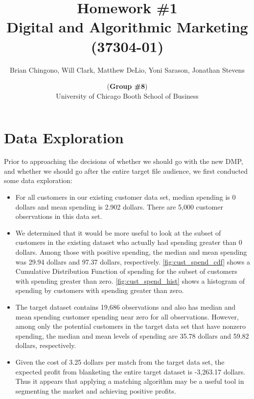 



\title{Homework \#1\\
Digital and Algorithmic Marketing (37304-01)}
\author{
Brian Chingono, Will Clark, Matthew DeLio, Yoni Sarason, Jonathan Stevens \and (\textbf{Group \#8})\\
University of Chicago Booth School of Business}

\maketitle

\section{Data Exploration}

Prior to approaching the decisions of whether we should go with the new DMP, and whether we should go after the entire target file audience, we first conducted some data exploration:  
\begin{itemize}

\item For all customers in our existing customer data set, median spending is 0 dollars and mean spending is 2.902 dollars. There are 5,000 customer observations in this data set.

\item We determined that it would be more useful to look at the subset of customers in the existing dataset who actually had spending greater than 0 dollars.  Among those with positive spending, the median and mean spending was 29.94 dollars and 97.37 dollars, respectively.  \vref{fig:cust_spend_cdf} shows a Cumulative Distribution Function of spending for the subset of customers with spending greater than zero. \vref{fig:cust_spend_hist} shows a histogram of spending by customers with spending greater than zero.  

\item The target dataset contains 19,686 observations and also has median and mean spending customer spending near zero for all observations.  However, among only the potential customers in the target data set that have nonzero spending, the median and mean levels of spending are 35.78 dollars and 59.82 dollars, respectively. 

\item Given the cost of 3.25 dollars per match from the target data set, the expected profit from blanketing the entire target dataset is -3,263.17 dollars.  Thus it appears that applying a matching algorithm may be a useful tool in segmenting the market and achieving positive profits.  

\end{itemize}

